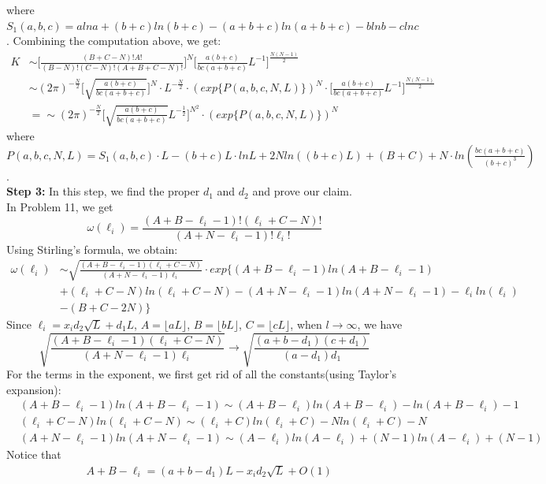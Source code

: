 \documentclass[12pt]{article}
\begin{document}
where $S_{1}(a,b,c)=alna+(b+c)ln(b+c)-(a+b+c)ln(a+b+c)-blnb-clnc$.
Combining the computation above, we get:
\begin{align*}
	K &\sim \Big[\frac{(B+C-N)!A!}{(B-N)!(C-N)!(A+B+C-N)!}\Big]^{N}\Big[\frac{a(b+c)}{bc(a+b+c)}L^{-1}\Big]^{\frac{N(N-1)}{2}}\\
	&\sim (2\pi)^{-\frac{N}{2}}\Big[\sqrt{\frac{a(b+c)}{bc(a+b+c)}}\Big]^{N}\cdot L^{-\frac{N}{2}}\cdot (exp\{P(a,b,c,N,L)\})^{N}\cdot\Big[\frac{a(b+c)}{bc(a+b+c)}L^{-1}\Big]^{\frac{N(N-1)}{2}}\\
	&= \sim (2\pi)^{-\frac{N}{2}}\Big[\sqrt{\frac{a(b+c)}{bc(a+b+c)}}L^{-\frac{1}{2}}\Big]^{N^2}\cdot (exp\{P(a,b,c,N,L)\})^{N}
\end{align*}
where $P(a,b,c,N,L)=S_{1}(a,b,c)\cdot L-(b+c)L\cdot lnL+2Nln((b+c)L)+(B+C)+N\cdot ln(\frac{bc(a+b+c)}{(b+c)^3})$.\\
\textbf{Step 3:} In this step, we find the proper $d_{1}$ and $d_{2}$ and prove our claim.\\
In Problem 11, we get $$\omega(\ell_{i})=\frac{(A+B-\ell_{i}-1)!(\ell_{i}+C-N)!}{(A+N-\ell_{i}-1)!\ell_{i}!}$$ Using Stirling's formula, we obtain:
\begin{align*}
	\omega(\ell_{i})&\sim \sqrt{\frac{(A+B-\ell_{i}-1)(\ell_{i}+C-N)}{(A+N-\ell_{i}-1)\ell_{i}}}\cdot exp\{(A+B-\ell_{i}-1)ln(A+B-\ell_{i}-1)\\ 
	& + (\ell_{i}+C-N)ln(\ell_{i}+C-N)-(A+N-\ell_{i}-1)ln(A+N-\ell_{i}-1)-\ell_{i}ln(\ell_{i})\\
	& -(B+C-2N)\}
\end{align*}
Since $\ell_{i}=x_{i}d_{2}\sqrt{L}+d_{1}L$, $A=\lfloor aL \rfloor$, $B=\lfloor bL \rfloor$, $C=\lfloor cL \rfloor$, when $l\rightarrow\infty$, we have $$\sqrt{\frac{(A+B-\ell_{i}-1)(\ell_{i}+C-N)}{(A+N-\ell_{i}-1)\ell_{i}}}\rightarrow \sqrt{\frac{(a+b-d_{1})(c+d_{1})}{(a-d_{1})d_{1}}}$$
For the terms in the exponent, we first get rid of all the constants(using Taylor's expansion):
\begin{align*}
	&(A+B-\ell_{i}-1)ln(A+B-\ell_{i}-1)\sim (A+B-\ell_{i})ln(A+B-\ell_{i})-ln(A+B-\ell_{i})-1\\
	& (\ell_{i}+C-N)ln(\ell_{i}+C-N)\sim (\ell_{i}+C)ln(\ell_{i}+C)-Nln(\ell_{i}+C)-N\\
	& (A+N-\ell_{i}-1)ln(A+N-\ell_{i}-1)\sim (A-\ell_{i})ln(A-\ell_{i})+(N-1)ln(A-\ell_{i})+(N-1)
\end{align*}
Notice that
\begin{align*}
	& A+B-\ell_{i} = (a+b-d_1)L-x_{i}d_{2}\sqrt{L}+O(1)
\end{align*}
\end{document}
